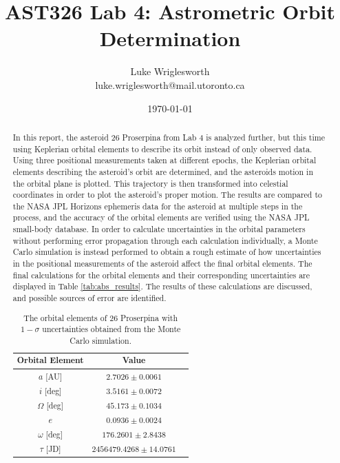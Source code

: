 \documentclass{article}
\title{AST326 Lab 4: Astrometric Orbit Determination}
\author{Luke Wriglesworth \\ \small luke.wriglesworth@mail.utoronto.ca}
\date{\today}
\begin{document}
\maketitle

\begin{abstract}
In this report, the asteroid 26 Proserpina from Lab 4 is analyzed further, but this time using Keplerian orbital elements to describe its orbit instead of only observed data. Using three positional measurements taken 
at different epochs, the Keplerian orbital elements describing the asteroid's orbit are determined, and the asteroids motion in the orbital plane is plotted. This trajectory is then transformed into celestial coordinates in 
order to plot the asteroid's proper motion. The results are compared to the NASA JPL Horizons ephemeris data for the asteroid at multiple steps in the process, and the accuracy of the orbital elements are verified using the NASA JPL small-body database. In order to calculate
uncertainties in the orbital parameters without performing error propagation through each calculation individually, a Monte Carlo simulation is instead performed to obtain a rough estimate of how uncertainties in the positional measurements
of the asteroid affect the final orbital elements. The final calculations for the orbital elements and their corresponding uncertainties are displayed in Table \ref{tab:abs_results}. The results of these calculations are discussed, 
and possible sources of error are identified. 

\begin{table}[H]
    \centering
    \begin{tabular}{|c|c|c|}
        \hline 
        \textbf{Orbital Element} & \textbf{Value}\\
        \hline
        $a$ [AU] & $2.7026 \pm 0.0061$ \\
        \hline
        $i$ [deg] & $3.5161 \pm 0.0072$ \\
        \hline
        $\Omega$ [deg] & $45.173 \pm 0.1034$ \\
        \hline
        $e$ & $0.0936 \pm 0.0024$  \\
        \hline
        $\omega$ [deg] & $176.2601 \pm 2.8438$ \\
        \hline
        $\tau$ [JD] & $2456479.4268 \pm 14.0761$ \\
        \hline
    \end{tabular}
        \caption{The orbital elements of 26 Proserpina with $1-\sigma$ uncertainties obtained from the Monte Carlo simulation.}
        \label{tab:abs_results}
    \end{table}


\end{abstract}
\end{document}
